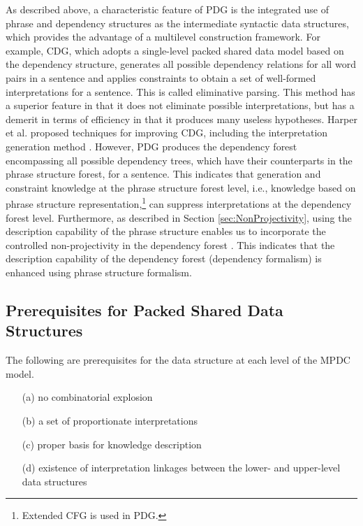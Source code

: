 \documentclass[english]{jnlp_1.4_rep}
\theoremstyle{break}
\theoremstyle{plain}
\theoremstyle{plain}
\begin{document}
As described above, a characteristic feature of PDG is the integrated
use of phrase and dependency structures as the intermediate syntactic
data structures, which provides the advantage of a multilevel
construction framework. For example, CDG, which adopts a single-level
packed shared data model based on the dependency structure, generates
all possible dependency relations for all word pairs in a sentence and
applies constraints to obtain a set of well-formed interpretations for
a sentence. This is called eliminative parsing. This method has a
superior feature in that it does not eliminate possible
interpretations, but has a demerit in terms of efficiency in that it
produces many useless hypotheses. Harper et al. proposed techniques
for improving CDG, including the interpretation generation method
\cite{Harper99}. However, PDG produces the dependency forest
encompassing all possible dependency trees, which have their
counterparts in the phrase structure forest, for a sentence. This
indicates that generation and constraint knowledge at the phrase
structure forest level, i.e., knowledge based on phrase structure
representation,\footnote{Extended CFG is used in PDG.} can suppress
interpretations at the dependency forest level. Furthermore, as
described in Section \ref{sec:NonProjectivity}, using the description
capability of the phrase structure enables us to incorporate the
controlled non-projectivity in the dependency forest
\cite{Hirakawa06b_e,Hirakawa07}. This indicates that the description
capability of the dependency forest (dependency formalism) is enhanced
using phrase structure formalism.


\subsection{Prerequisites for Packed Shared Data Structures}
\label{sec:PrerequisitesForPackedSharedDataStructure}

The following are prerequisites for the data structure at each level of the MPDC model.

\begin{itemize}
\item[(a)] no combinatorial explosion
\item[(b)] a set of proportionate interpretations
\item[(c)] proper basis for knowledge description
\item[(d)] existence of interpretation linkages between the lower- and upper-level data structures
\end{itemize}
\end{document}
